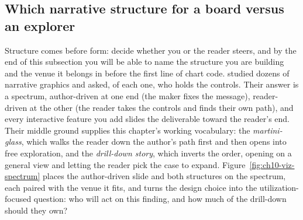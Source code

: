\subsection{Which narrative structure for a board versus an explorer}\label{ch10-sec:structures}
Structure comes before form: decide whether you or the reader steers, and by the end of this subsection you will be able to name the structure you are building and the venue it belongs in before the first line of chart code. \textcite{segel2010narrative} studied dozens of narrative graphics and asked, of each one, who holds the controls. Their answer is a spectrum, author-driven at one end (the maker fixes the message), reader-driven at the other (the reader takes the controls and finds their own path), and every interactive feature you add slides the deliverable toward the reader's end. Their middle ground supplies this chapter's working vocabulary: the \emph{martini-glass}, which walks the reader down the author's path first and then opens into free exploration, and the \emph{drill-down story}, which inverts the order, opening on a general view and letting the reader pick the case to expand. Figure~\ref{fig:ch10-viz-spectrum} places the author-driven slide and both structures on the spectrum, each paired with the venue it fits, and turns the design choice into the utilization-focused question: who will act on this finding, and how much of the drill-down should they own?

